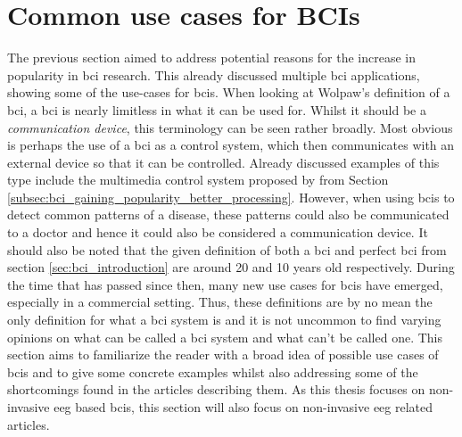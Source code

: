 
\section{Common use cases for BCIs}
\label{sec:bci_common_use_cases}

The previous section aimed to address potential reasons for the increase in popularity in \gls{bci} research.
This already discussed multiple \gls{bci} applications, showing some of the use-cases for \glspl{bci}.
When looking at Wolpaw's definition of a \gls{bci}, a \gls{bci} is nearly limitless in what it can be used for.
Whilst it should be a \textit{communication device}, this terminology can be seen rather broadly.
Most obvious is perhaps the use of a \gls{bci} as a control system, which then communicates with an external device so that it can be controlled.
Already discussed examples of this type include the multimedia control system proposed by \citet{early_bci_multimedia} from Section \ref{subsec:bci_gaining_popularity_better_processing}.
However, when using \glspl{bci} to detect common patterns of a disease, these patterns could also be communicated to a doctor and hence it could also be considered a communication device.
It should also be noted that the given definition of both a \gls{bci} and perfect \gls{bci} from section \ref{sec:bci_introduction} are around 20 and 10 years old respectively.
During the time that has passed since then, many new use cases for \glspl{bci} have emerged, especially in a commercial setting.
Thus, these definitions are by no mean the only definition for what a \gls{bci} system is and it is not uncommon to find varying opinions on what can be called a \gls{bci} system and what can't be called one.
This section aims to familiarize the reader with a broad idea of possible use cases of \glspl{bci} and to give some concrete examples whilst also addressing some of the shortcomings found in the articles describing them.
As this thesis focuses on non-invasive \gls{eeg} based \glspl{bci}, this section will also focus on non-invasive \gls{eeg} related articles.

